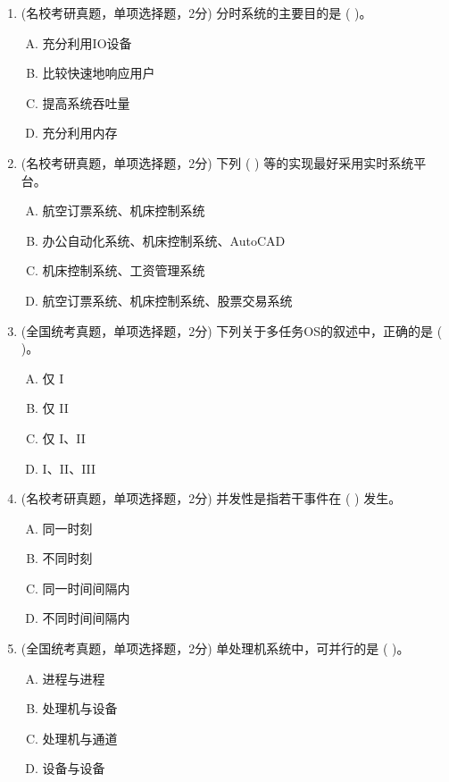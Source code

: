 \documentclass[lang=cn,newtx,10pt,scheme=chinese]{../../elegantbook}
\begin{document}
\begin{enumerate}
    \item (名校考研真题，单项选择题，2分) 分时系统的主要目的是 (    )。
    \begin{enumerate}[A.]
        \item 充分利用IO设备
        \item 比较快速地响应用户
        \item 提高系统吞吐量
        \item 充分利用内存
    \end{enumerate}
    \item (名校考研真题，单项选择题，2分) 下列 (    ) 等的实现最好采用实时系统平台。
    \begin{enumerate}[A.]
        \item 航空订票系统、机床控制系统
        \item 办公自动化系统、机床控制系统、AutoCAD
        \item 机床控制系统、工资管理系统
        \item 航空订票系统、机床控制系统、股票交易系统
    \end{enumerate}

    \item (全国统考真题，单项选择题，2分) 下列关于多任务OS的叙述中，正确的是 (    )。
    \begin{enumerate}[A.]
        \item 仅 I
        \item 仅 II
        \item 仅 I、II
        \item I、II、III
    \end{enumerate}

    \item (名校考研真题，单项选择题，2分) 并发性是指若干事件在 (    ) 发生。
    \begin{enumerate}[A.]
        \item 同一时刻
        \item 不同时刻
        \item 同一时间间隔内
        \item 不同时间间隔内
    \end{enumerate}

    \item (全国统考真题，单项选择题，2分) 单处理机系统中，可并行的是 (    )。
    \begin{enumerate}[A.]
        \item 进程与进程
        \item 处理机与设备
        \item 处理机与通道
        \item 设备与设备
    \end{enumerate}


\end{enumerate}
\end{document}

